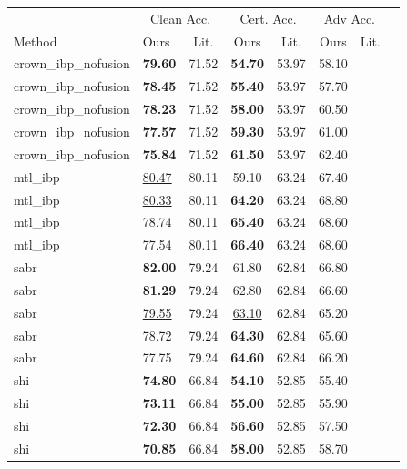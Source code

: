 \begin{tabular}{llcccccc}
\toprule
 & \multicolumn{2}{c}{Clean Acc.} & \multicolumn{2}{c}{Cert. Acc.} & \multicolumn{2}{c}{Adv Acc.} \\
Method & Ours & Lit. & Ours & Lit. & Ours & Lit. \\
\midrule
crown\_ibp\_nofusion & \textbf{79.60} & 71.52 & \textbf{54.70} & 53.97 & 58.10 & \\
crown\_ibp\_nofusion & \textbf{78.45} & 71.52 & \textbf{55.40} & 53.97 & 57.70 & \\
crown\_ibp\_nofusion & \textbf{78.23} & 71.52 & \textbf{58.00} & 53.97 & 60.50 & \\
crown\_ibp\_nofusion & \textbf{77.57} & 71.52 & \textbf{59.30} & 53.97 & 61.00 & \\
crown\_ibp\_nofusion & \textbf{75.84} & 71.52 & \textbf{61.50} & 53.97 & 62.40 & \\
mtl\_ibp & \underline{80.47} & 80.11 & 59.10 & 63.24 & 67.40 & \\
mtl\_ibp & \underline{80.33} & 80.11 & \textbf{64.20} & 63.24 & 68.80 & \\
mtl\_ibp & 78.74 & 80.11 & \textbf{65.40} & 63.24 & 68.60 & \\
mtl\_ibp & 77.54 & 80.11 & \textbf{66.40} & 63.24 & 68.60 & \\
sabr & \textbf{82.00} & 79.24 & 61.80 & 62.84 & 66.80 & \\
sabr & \textbf{81.29} & 79.24 & 62.80 & 62.84 & 66.60 & \\
sabr & \underline{79.55} & 79.24 & \underline{63.10} & 62.84 & 65.20 & \\
sabr & 78.72 & 79.24 & \textbf{64.30} & 62.84 & 65.60 & \\
sabr & 77.75 & 79.24 & \textbf{64.60} & 62.84 & 66.20 & \\
shi & \textbf{74.80} & 66.84 & \textbf{54.10} & 52.85 & 55.40 & \\
shi & \textbf{73.11} & 66.84 & \textbf{55.00} & 52.85 & 55.90 & \\
shi & \textbf{72.30} & 66.84 & \textbf{56.60} & 52.85 & 57.50 & \\
shi & \textbf{70.85} & 66.84 & \textbf{58.00} & 52.85 & 58.70 & \\
\bottomrule
\end{tabular}